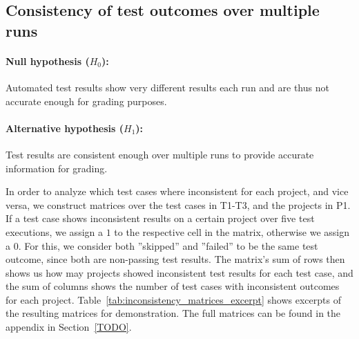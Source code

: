 \subsection{Consistency of test outcomes over multiple runs}

\paragraph{Null hypothesis ($H_0$):}
Automated test results show very different results each run and are thus not accurate enough for grading purposes.
\vspace{-\medskipamount}
\paragraph{Alternative hypothesis ($H_1$):}
Test results are consistent enough over multiple runs to provide accurate information for grading.
\parspace

In order to analyze which test cases where inconsistent for each project, and vice versa,
we construct matrices over the test cases in T1-T3, and the projects in P1.
If a test case shows inconsistent results on a certain project over five test executions,
we assign a $1$ to the respective cell in the matrix, otherwise we assign a 0.
For this, we consider both ''skipped'' and ''failed'' to be the same test outcome, since both are non-passing test results.
The matrix's sum of rows then shows us how may projects showed inconsistent test results for each test case,
and the sum of columns shows the number of test cases with inconsistent outcomes for each project.
Table~\ref{tab:inconsistency_matrices_excerpt} shows excerpts of the resulting matrices for demonstration.
The full matrices can be found in the appendix in Section~\ref{TODO}.
\parspace

